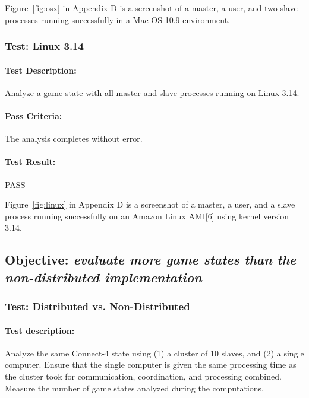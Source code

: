 \documentclass[pdftex,12pt,a4paper]{article}
\begin{document}
Figure~\ref{fig:osx} in Appendix D is a screenshot of a master, a user, and two slave processes running successfully in a Mac OS 10.9 environment.

\subsubsection{\textbf{Test:} Linux 3.14}

\paragraph{Test Description:} Analyze a game state with all master and slave processes running on Linux 3.14.

\paragraph{Pass Criteria:} The analysis completes without error.

\paragraph{Test Result:} PASS

Figure~\ref{fig:linux} in Appendix D is a screenshot of a master, a user, and a slave process running successfully on an Amazon Linux AMI[6] using kernel version 3.14.



\subsection{\textbf{Objective:} \emph{evaluate more game states than the non-distributed implementation}}\label{sec:obj-number-analyzed}

\subsubsection{\textbf{Test:} Distributed vs. Non-Distributed}\label{sec:number-analyzed}

\paragraph{Test description:} Analyze the same Connect-4 state using (1) a cluster of 10 slaves, and (2) a single computer. Ensure that the single computer is given the same processing time as the cluster took for communication, coordination, and processing combined. Measure the number of game states analyzed during the computations.
\end{document}
